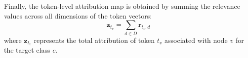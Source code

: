 Finally, the token-level attribution map is obtained by summing the relevance values across all dimensions of the token vectors:
\begin{equation}
    \mathbf{z}_{t_v} = \sum_{d \in D} \mathbf{r}_{t_v,d}
\end{equation}
where \( \mathbf{z}_{t_v} \) represents the total attribution of token \( t_v \) associated with node \( v \) for the target class \( c \).




